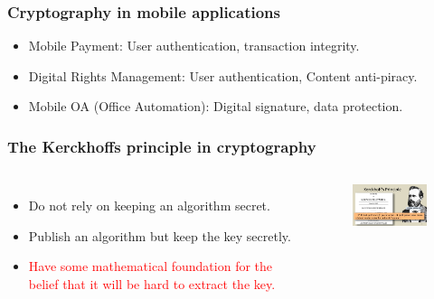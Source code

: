 \documentclass{beamer}
\begin{document}
\frame
{
\frametitle{Cryptography in mobile applications}
\begin{itemize}
\setlength{\itemsep}{12pt}
\item Mobile Payment: User authentication, transaction integrity.

\item Digital Rights Management: User authentication, Content anti-piracy.

\item Mobile OA (Office Automation): Digital signature, data protection.
\end{itemize}

}

\frame
{
\frametitle{The Kerckhoffs principle in cryptography}
\begin{columns}[c]
\begin{itemize}
\setlength{\itemsep}{12pt}
\item Do not rely on keeping an algorithm secret.
\item Publish an algorithm but keep the key secretly.
\item \textcolor{red}{Have some mathematical foundation for the belief that it will be hard to extract the key.}
\end{itemize}

\begin{figure}[htbp]
\centering
  \includegraphics[width=4cm]{./pics/Kerckhoff.jpg}
\end{figure}

\end{columns}
}
\end{document}
